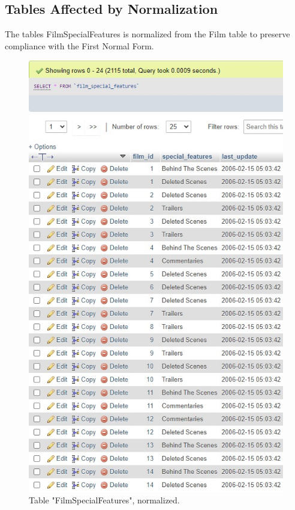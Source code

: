 \documentclass{article}
\begin{document}
	\subsection{Tables Affected by Normalization}
		The tables Film\textunderscore Special\textunderscore Features is normalized from the Film table to preserve compliance with the First Normal Form. 
		\begin{figure}[H]
			\includegraphics[height = \textheight]{table_filmspecialfeatures_norm}
			\caption{Table "Film\textunderscore Special\textunderscore Features", normalized.}
		\end{figure}
\end{document}
